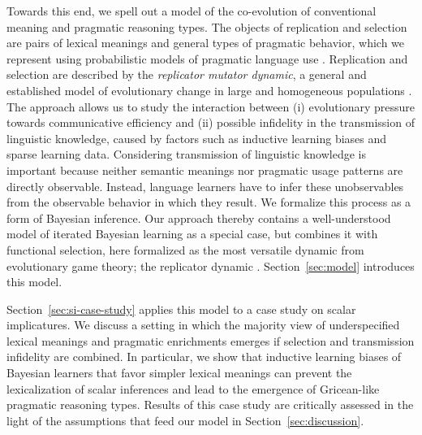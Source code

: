 \documentclass[a4paper, 11pt]{article}
\begin{document}
Towards this end, we spell out a model of the co-evolution of conventional meaning and
pragmatic reasoning types. The objects of replication and selection are pairs of lexical
meanings and general types of pragmatic behavior, which we represent using probabilistic models
of pragmatic language use
\citep{frank+goodman:2012,FrankeJager2015:Probabilistic-p,GoodmanFrank2016:Pragmatic-Langu}. Replication
and selection are described by the \emph{replicator mutator dynamic}, a general and established
model of evolutionary change in large and homogeneous populations
\citep{Hofbauer1985:The-Selection-M,nowak+etal:2000,NowakKomarova2001:Evolution-of-Un,hofbauer+sigmund:2003,Nowak2006:Evolutionary-Dy}. The
approach allows us to study the interaction between (i) evolutionary pressure towards
communicative efficiency and (ii) possible infidelity in the transmission of linguistic
knowledge, caused by factors such as inductive learning biases and sparse learning
data. Considering transmission of linguistic knowledge is important because neither semantic
meanings nor pragmatic usage patterns are directly observable. Instead, language learners have
to infer these unobservables from the observable behavior in which they result. We formalize
this process as a form of Bayesian inference. Our approach thereby contains a well-understood
model of iterated Bayesian learning \citep{griffiths+kalish:2007} as a special case, but
combines it with functional selection, here formalized as the most versatile dynamic from
evolutionary game theory; the replicator dynamic
\citep{TaylorJonker1978:Evolutionary-St}. Section~\ref{sec:model} introduces this model.

Section~\ref{sec:si-case-study} applies this model to a case study on scalar implicatures. We
discuss a setting in which the majority view of underspecified lexical meanings and pragmatic
enrichments emerges if selection and transmission infidelity are combined. In particular, we
show that inductive learning biases of Bayesian learners that favor simpler lexical meanings
can prevent the lexicalization of scalar inferences and lead to the emergence of Gricean-like
pragmatic reasoning types. Results of this case study are critically assessed in the light of
the assumptions that feed our model in Section~\ref{sec:discussion}.

\end{document}
